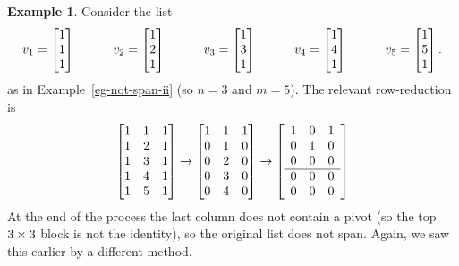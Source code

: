 \documentclass[reqno]{amsart}
\theoremstyle{definition}
\newtheorem{example}[theorem]{Example}
\begin{document}
\begin{example}\label{eg-not-span-ii-matrix}
 Consider the list
 \[ v_1 = \left[\begin{matrix} 1 \\ 1 \\ 1 \end{matrix}\right] \hspace{3em}
    v_2 = \left[\begin{matrix} 1 \\ 2 \\ 1 \end{matrix}\right] \hspace{3em}
    v_3 = \left[\begin{matrix} 1 \\ 3 \\ 1 \end{matrix}\right] \hspace{3em}
    v_4 = \left[\begin{matrix} 1 \\ 4 \\ 1 \end{matrix}\right] \hspace{3em}
    v_5 = \left[\begin{matrix} 1 \\ 5 \\ 1 \end{matrix}\right].
 \]
 as in Example~\ref{eg-not-span-ii} (so $n=3$ and $m=5$).  The
 relevant row-reduction is
 \[
  \left[\begin{matrix} 1 & 1 & 1 \\ 1 & 2 & 1 \\ 1 & 3 & 1 \\ 1 & 4 & 1 \\ 1 & 5 & 1 \end{matrix}\right]
  \to
  \left[\begin{matrix} 1 & 1 & 1 \\ 0 & 1 & 0 \\ 0 & 2 & 0 \\ 0 & 3 & 0 \\ 0 & 4 & 0 \end{matrix}\right]
  \to
  \left[\begin{array}{ccc}
   1 & 0 & 1 \\
   0 & 1 & 0 \\
   0 & 0 & 0 \\ \hline
   0 & 0 & 0 \\
   0 & 0 & 0 
  \end{array}\right]
 \]
 At the end of the process the last column does not contain a pivot
 (so the top $3\times 3$ block is not the identity),
 so the original list does not span.  Again, we saw this earlier by a
 different method.
\end{example}
\end{document}
